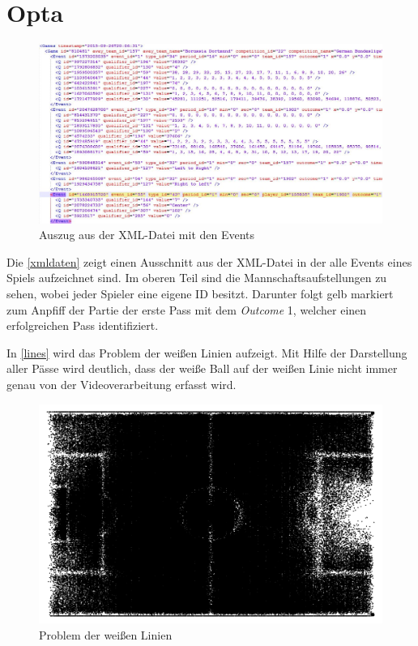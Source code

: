\newcommand{\waInputStyles}{\texttt{se-wa-input-styles-v097.tex}}

\chapter{Opta}

\begin{figure}[H]
\centering
\includegraphics[scale=0.52]{se-wa-jpg/daten}
\caption{Auszug aus der XML-Datei mit den Events}
\label{xmldaten}
\end{figure}

Die \vref{xmldaten} zeigt einen Ausschnitt aus der XML-Datei in der alle Events eines Spiels aufzeichnet sind. Im oberen Teil sind die Mannschaftsaufstellungen zu sehen, wobei jeder Spieler eine eigene ID besitzt. Darunter folgt gelb markiert zum Anpfiff der Partie der erste Pass mit dem \textit{Outcome} 1, welcher einen erfolgreichen Pass identifiziert.

In \vref{lines} wird das Problem der weißen Linien aufzeigt. Mit Hilfe der Darstellung aller Pässe wird deutlich, dass der weiße Ball auf der weißen Linie nicht immer genau von der Videoverarbeitung erfasst wird. 

\begin{figure}
\centering
\includegraphics[scale=0.3]{se-wa-jpg/lines}
\caption[Problem der weißen Linien]{Problem der weißen Linien}
\label{lines}
\end{figure}

